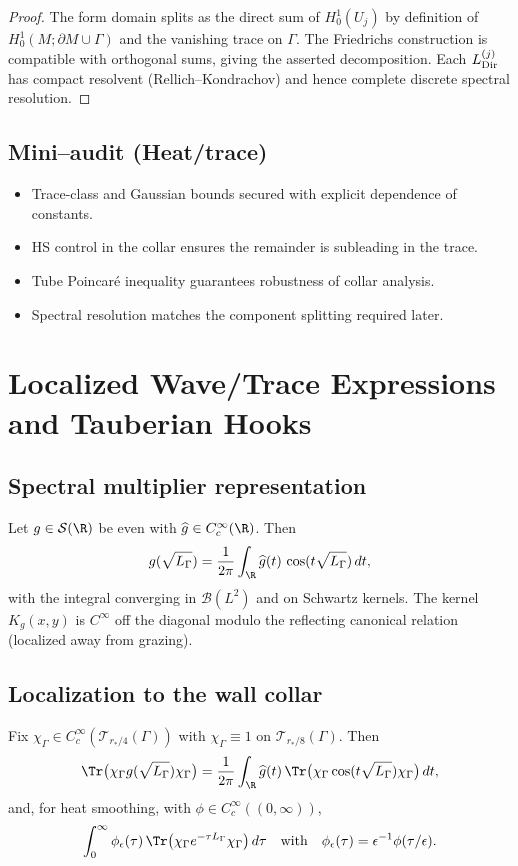 \begin{proof}
The form domain splits as the direct sum of $H^1_0(U_j)$ by definition of $H^1_0(M;\partial M\cup\Gamma)$ and the vanishing trace on $\Gamma$. The Friedrichs construction is compatible with orthogonal sums, giving the asserted decomposition. Each $L^{(j)}_{\rm Dir}$ has compact resolvent (Rellich–Kondrachov) and hence complete discrete spectral resolution.
\end{proof}

\subsection*{Mini–audit (Heat/trace)}
\begin{itemize}
  \item Trace-class and Gaussian bounds secured with explicit dependence of constants.
  \item HS control in the collar ensures the remainder is subleading in the trace.
  \item Tube Poincaré inequality guarantees robustness of collar analysis.
  \item Spectral resolution matches the component splitting required later.
\end{itemize}

\section{Localized Wave/Trace Expressions and Tauberian Hooks}
\label{sec:localized-trace}

\subsection{Spectral multiplier representation}
Let $g\in\mathcal S(\R)$ be even with $\widehat g\in C_c^\infty(\R)$. Then
\[
g(\sqrt{L_\Gamma})
=\frac{1}{2\pi}\int_{\R} \widehat g(t)\,\cos(t\sqrt{L_\Gamma})\,dt,
\]
with the integral converging in $\mathcal B(L^2)$ and on Schwartz kernels. The kernel $K_g(x,y)$ is $C^\infty$ off the diagonal modulo the reflecting canonical relation (localized away from grazing).

\subsection{Localization to the wall collar}
Fix $\chi_\Gamma\in C_c^\infty(\mathcal T_{r_*/4}(\Gamma))$ with $\chi_\Gamma\equiv1$ on $\mathcal T_{r_*/8}(\Gamma)$. Then
\[
\Tr\big(\chi_\Gamma g(\sqrt{L_\Gamma})\chi_\Gamma\big)
=\frac{1}{2\pi}\int_{\R}\widehat g(t)\,\Tr\big(\chi_\Gamma \cos(t\sqrt{L_\Gamma})\chi_\Gamma\big)\,dt,
\]
and, for heat smoothing, with $\phi\in C_c^\infty((0,\infty))$,
\[
\int_0^\infty \phi_\epsilon(\tau)\,\Tr\big(\chi_\Gamma e^{-\tau L_\Gamma}\chi_\Gamma\big)\,d\tau
\quad \text{with}\quad \phi_\epsilon(\tau)=\epsilon^{-1}\phi(\tau/\epsilon).
\]

